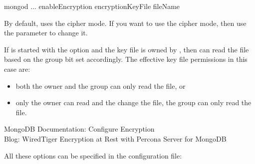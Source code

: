 \documentclass[letterpaper,10pt,english]{sphinxmanual}
\begin{document}
\begin{sphinxVerbatim}[commandchars=\\\{\}]
\PYGZdl{} mongod ... \PYGZhy{}\PYGZhy{}enableEncryption \PYGZhy{}\PYGZhy{}encryptionKeyFile \PYGZlt{}fileName\PYGZgt{}
\end{sphinxVerbatim}

\sphinxAtStartPar
By default,  uses the  cipher mode. If you want to use the  cipher mode, then use the  parameter to change it.

\sphinxAtStartPar
If  is started with the  option and the key file
is owned by , then  can read the file based on the
group bit set accordingly. The effective key file permissions in this
case are:
\begin{itemize}
\item {} 
\sphinxAtStartPar
{} \sphinxhyphen{} both the owner and the group can only read the file, or

\item {} 
\sphinxAtStartPar
{} \sphinxhyphen{} only the owner can read and the change the file, the group can only read the file.

\end{itemize}


\nopagebreak

\begin{description}
\item[{MongoDB Documentation: Configure Encryption}] \leavevmode
\sphinxAtStartPar
{}

\item[{ Blog: WiredTiger Encryption at Rest with Percona Server for MongoDB}] \leavevmode
\sphinxAtStartPar
{}

\end{description}



\sphinxAtStartPar
All these options can be specified in the configuration file:
\end{document}
